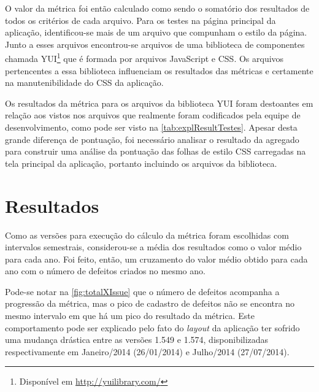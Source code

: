 O valor da métrica foi então calculado como sendo o somatório dos resultados de todos os critérios de cada arquivo. %
Para os testes na página principal da aplicação, identificou-se mais de um arquivo que compunham o estilo da página. Junto a esses arquivos encontrou-se arquivos de uma biblioteca de componentes chamada YUI\footnote{Disponível em \url{http://yuilibrary.com/}} que é formada por arquivos JavaScript e CSS. Os arquivos pertencentes a essa biblioteca influenciam os resultados das métricas e certamente na manutenibilidade do CSS da aplicação.

Os resultados da métrica para os arquivos da biblioteca YUI foram destoantes em relação aos vistos nos arquivos que realmente foram codificados pela equipe de desenvolvimento, como pode ser visto na \autoref{tab:explResultTestes}. Apesar desta grande diferença de pontuação, foi necessário  analisar o resultado da agregado para construir uma análise da pontuação das folhas de estilo CSS carregadas na tela principal da aplicação, portanto incluindo os arquivos da biblioteca.



\section{Resultados}

Como as versões para execução do cálculo da métrica foram escolhidas com intervalos semestrais, considerou-se a média dos resultados como o valor médio para cada ano. Foi feito, então, um cruzamento do valor médio obtido para cada ano com o número de defeitos criados no mesmo ano.

Pode-se notar na \autoref{fig:totalXIssue} que o número de defeitos acompanha a progressão da métrica, mas o pico de cadastro de defeitos não se encontra no mesmo intervalo em que há um pico do resultado da métrica. Este comportamento pode ser explicado pelo fato do \textit{layout} da aplicação ter sofrido uma mudança drástica entre as versões 1.549 e 1.574, disponibilizadas respectivamente em Janeiro/2014 (26/01/2014) e Julho/2014 (27/07/2014).

